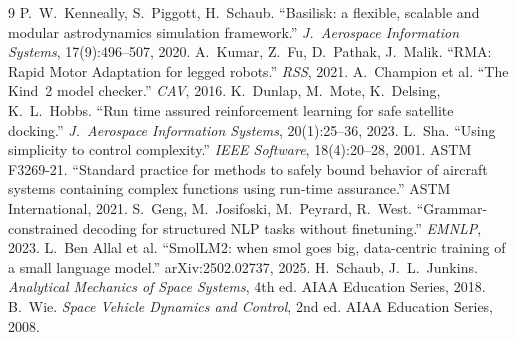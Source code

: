 \documentclass[journal]{IEEEtran}
\begin{document}
\begin{thebibliography}{9}\small
{} P.~W.~Kenneally, S.~Piggott, H.~Schaub. ``Basilisk: a flexible, scalable and modular astrodynamics simulation framework.'' \emph{J.\ Aerospace Information Systems}, 17(9):496--507, 2020.
 A.~Kumar, Z.~Fu, D.~Pathak, J.~Malik. ``RMA: Rapid Motor Adaptation for legged robots.'' \emph{RSS}, 2021.
 A.~Champion et al. ``The Kind~2 model checker.'' \emph{CAV}, 2016.
 K.~Dunlap, M.~Mote, K.~Delsing, K.~L.~Hobbs. ``Run time assured reinforcement learning for safe satellite docking.'' \emph{J.\ Aerospace Information Systems}, 20(1):25--36, 2023.
 L.~Sha. ``Using simplicity to control complexity.'' \emph{IEEE Software}, 18(4):20--28, 2001.
 ASTM F3269-21. ``Standard practice for methods to safely bound behavior of aircraft systems containing complex functions using run-time assurance.'' ASTM International, 2021.
 S.~Geng, M.~Josifoski, M.~Peyrard, R.~West. ``Grammar-constrained decoding for structured NLP tasks without finetuning.'' \emph{EMNLP}, 2023.
 L.~Ben Allal et al. ``SmolLM2: when smol goes big, data-centric training of a small language model.'' arXiv:2502.02737, 2025.
 H.~Schaub, J.~L.~Junkins. \emph{Analytical Mechanics of Space Systems}, 4th ed. AIAA Education Series, 2018.
 B.~Wie. \emph{Space Vehicle Dynamics and Control}, 2nd ed. AIAA Education Series, 2008.
\end{thebibliography}
\end{document}
